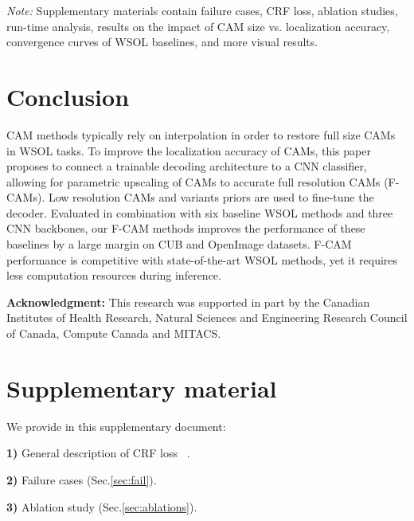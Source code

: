 \documentclass[twocolumn]{article}
\theoremstyle{definition}
\begin{document}
\noindent \emph{Note:} Supplementary materials contain failure cases, CRF loss, ablation studies, run-time analysis, results on the impact of CAM size vs. localization accuracy, convergence curves of WSOL baselines, and more visual results.


\section{Conclusion}
\label{sec:conclusion}
CAM methods typically rely on interpolation in order to restore full size CAMs in WSOL tasks. To improve the localization accuracy of CAMs, this paper proposes to connect a trainable decoding architecture to a CNN classifier, allowing for parametric upscaling of CAMs to accurate full resolution CAMs (F-CAMs). Low resolution CAMs and variants priors are used to fine-tune the decoder. Evaluated in combination with six baseline WSOL methods and three CNN backbones, our F-CAM methods improves the performance of these baselines by a large margin on CUB and OpenImage datasets.  F-CAM performance is competitive with state-of-the-art WSOL methods, yet it requires less computation resources during inference.


\noindent \textbf{Acknowledgment:} This research was supported in part by the Canadian Institutes of Health Research, Natural Sciences and Engineering Research Council of Canada, Compute Canada and MITACS.

\FloatBarrier

\renewcommand{\theequation}{\thesection.\arabic{equation}}
\setcounter{equation}{0}

\renewcommand\thefigure{\thesection.\arabic{figure}}
\setcounter{figure}{0}

\renewcommand\thetable{\thesection.\arabic{table}}
\setcounter{table}{0}

\appendices





\section{Supplementary material}


We provide in this supplementary document:


\noindent \textbf{1)} General description of CRF loss  ~\cite{tang2018regularized}.

\noindent \textbf{2)} Failure cases (Sec.\ref{sec:fail}).

\noindent \textbf{3)} Ablation study (Sec.\ref{sec:ablations}).
\end{document}
